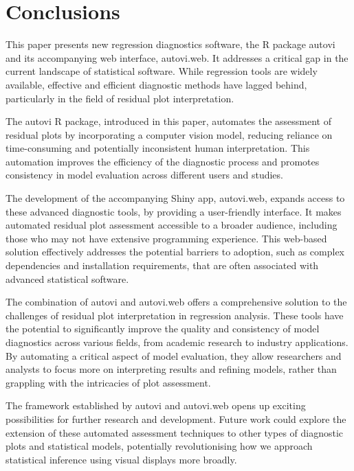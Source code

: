 \documentclass[
doublespace,
  times]{anzsauth}
\begin{document}
\section{Conclusions}\label{sec-autovi-conclusion}

This paper presents new regression diagnostics software, the \textsf{R}
package \textsf{autovi} and its accompanying web interface,
\textsf{autovi.web}. It addresses a critical gap in the current
landscape of statistical software. While regression tools are widely
available, effective and efficient diagnostic methods have lagged
behind, particularly in the field of residual plot interpretation.

The \textsf{autovi} \textsf{R} package, introduced in this paper,
automates the assessment of residual plots by incorporating a computer
vision model, reducing reliance on time-consuming and potentially
inconsistent human interpretation. This automation improves the
efficiency of the diagnostic process and promotes consistency in model
evaluation across different users and studies.

The development of the accompanying \textsf{Shiny} app,
\textsf{autovi.web}, expands access to these advanced diagnostic tools,
by providing a user-friendly interface. It makes automated residual plot
assessment accessible to a broader audience, including those who may not
have extensive programming experience. This web-based solution
effectively addresses the potential barriers to adoption, such as
complex dependencies and installation requirements, that are often
associated with advanced statistical software.

The combination of \textsf{autovi} and \textsf{autovi.web} offers a
comprehensive solution to the challenges of residual plot interpretation
in regression analysis. These tools have the potential to significantly
improve the quality and consistency of model diagnostics across various
fields, from academic research to industry applications. By automating a
critical aspect of model evaluation, they allow researchers and analysts
to focus more on interpreting results and refining models, rather than
grappling with the intricacies of plot assessment.

The framework established by \textsf{autovi} and \textsf{autovi.web}
opens up exciting possibilities for further research and development.
Future work could explore the extension of these automated assessment
techniques to other types of diagnostic plots and statistical models,
potentially revolutionising how we approach statistical inference using
visual displays more broadly.
\end{document}
